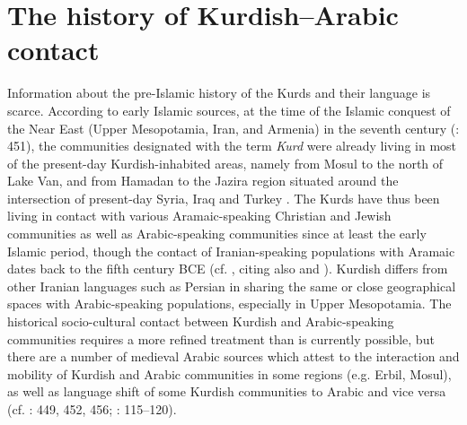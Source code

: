 \documentclass[output=paper]{langsci/langscibook}
\begin{document}
\section{The history of Kurdish–Arabic contact} 

Information about the pre-Islamic history of the Kurds and their language is scarce. According to early Islamic sources, at the time of the Islamic conquest of the Near East (Upper Mesopotamia, Iran, and Armenia) in the seventh century (\citealt{BoisEtAl2012}: 451), the communities designated with the term \textit{Kurd} were already living in most of the present-day Kurdish-inhabited areas, namely from Mosul to the north of Lake Van, and from Hamadan to the Jazira region situated around the intersection of present-day Syria, Iraq and Turkey \citep[111]{James2007}. The Kurds have thus been living in contact with various Aramaic-speaking Christian and Jewish communities as well as Arabic-speaking communities since at least the early Islamic period, though the contact of Iranian-speaking populations with Aramaic dates back to the fifth century BCE (cf. \citealt[69]{Utas2005}, citing also \citealt{Folmer1995} and \citealt{Kent1953}). Kurdish differs from other Iranian languages such as Persian in sharing the same or close geographical spaces with Arabic-speaking populations, especially in Upper Mesopotamia. The historical socio-cultural contact between Kurdish and Arabic-speaking communities requires a more refined treatment than is currently possible, but there are a number of medieval Arabic sources which attest to the interaction and mobility of Kurdish and Arabic communities in some regions (e.g. Erbil, Mosul), as well as language shift of some Kurdish communities to Arabic and vice versa (cf. \citealt{BoisEtAl2012}: 449, 452, 456; \citealt{James2007}: 115–120). 
\end{document}
